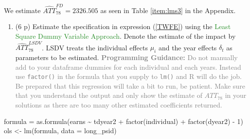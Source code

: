 \documentclass[
]{article}
\newenvironment{Shaded}{\begin{snugshade}}{\end{snugshade}}
\newcommand{\AttributeTok}[1]{\textcolor[rgb]{0.77,0.63,0.00}{#1}}
\newcommand{\DecValTok}[1]{\textcolor[rgb]{0.00,0.00,0.81}{#1}}
\newcommand{\FunctionTok}[1]{\textcolor[rgb]{0.00,0.00,0.00}{#1}}
\newcommand{\NormalTok}[1]{#1}
\newcommand{\OtherTok}[1]{\textcolor[rgb]{0.56,0.35,0.01}{#1}}
\newcommand{\SpecialCharTok}[1]{\textcolor[rgb]{0.00,0.00,0.00}{#1}}
\providecommand{\tightlist}{%
  \setlength{\itemsep}{0pt}\setlength{\parskip}{0pt}}
\begin{document}
\begin{Shaded}
\end{Shaded}

We estimate \(\widehat{ATT}_{78}^{FD} = 2326.505\) as seen in Table
\ref{item:lms3} in the Appendix.

\begin{enumerate}
\def\labelenumi{\arabic{enumi}.}
\setcounter{enumi}{2}
\tightlist
\item
  (6 p) Estimate the specification in expression (\ref{TWFE}) using the
  \textcolor{ForestGreen}{Least Square Dummy Variable Approach}. Denote
  the estimate of the impact by \(\widehat{ATT}_{78}^{LSDV}\). LSDV
  treats the individual effects \(\mu_i\) and the year effects
  \(\delta_t\) as parameters to be estimated.
  \textcolor{Gray}{\textbf{Programming Guidance:} Do not manually add to your dataframe dummies for each individual and each years. Instead use \texttt{factor()} in the formula that you supply to \texttt{lm()} and R will do the job. Be prepared that this regression will take a bit to run, be patient. Make sure that you understand the output and only show the estimate of ${ATT}_{78}$ in your solutions as there are too many other estimated coefficients returned.}\label{item:lsdv}
\end{enumerate}

\begin{Shaded}
\end{Shaded}

\begin{Shaded}
\begin{Highlighting}[]
\NormalTok{formula }\OtherTok{=} \FunctionTok{as.formula}\NormalTok{(earns }\SpecialCharTok{\textasciitilde{}}\NormalTok{ tdyear2 }\SpecialCharTok{+} \FunctionTok{factor}\NormalTok{(individual) }\SpecialCharTok{+} \FunctionTok{factor}\NormalTok{(dyear2) }\SpecialCharTok{{-}} \DecValTok{1}\NormalTok{)}
\NormalTok{ols }\OtherTok{\textless{}{-}} \FunctionTok{lm}\NormalTok{(formula, }\AttributeTok{data =}\NormalTok{ long\_psid)}
\end{Highlighting}
\end{Shaded}
\end{document}
